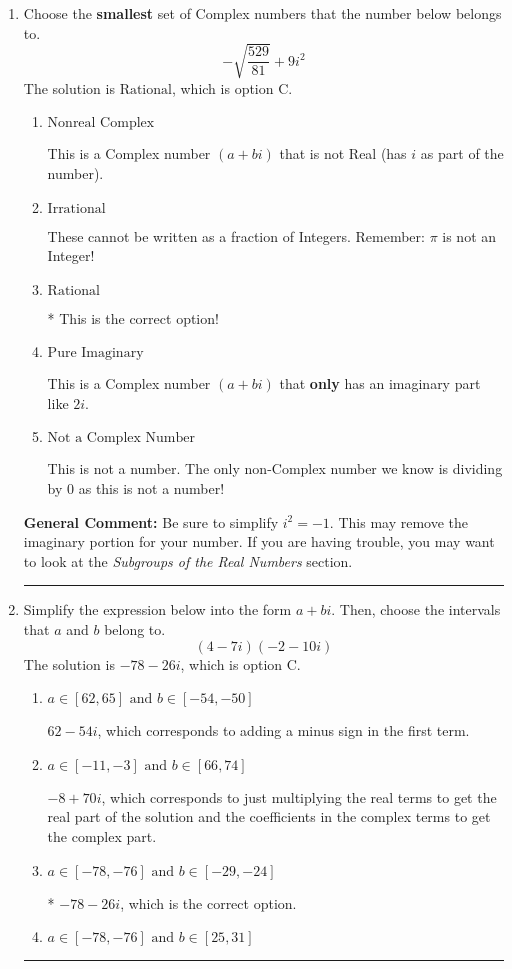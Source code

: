 \documentclass{extbook}[14pt]
\newcommand{\litem}[1]{\item #1

\rule{\textwidth}{0.4pt}}
\begin{document}
\begin{enumerate}\litem{
Choose the \textbf{smallest} set of Complex numbers that the number below belongs to.
\[ -\sqrt{\frac{529}{81}} + 9i^2 \]The solution is \( \text{Rational} \), which is option C.\begin{enumerate}[label=\Alph*.]
\item \( \text{Nonreal Complex} \)

This is a Complex number $(a+bi)$ that is not Real (has $i$ as part of the number).
\item \( \text{Irrational} \)

These cannot be written as a fraction of Integers. Remember: $\pi$ is not an Integer!
\item \( \text{Rational} \)

* This is the correct option!
\item \( \text{Pure Imaginary} \)

This is a Complex number $(a+bi)$ that \textbf{only} has an imaginary part like $2i$.
\item \( \text{Not a Complex Number} \)

This is not a number. The only non-Complex number we know is dividing by 0 as this is not a number!
\end{enumerate}

\textbf{General Comment:} Be sure to simplify $i^2 = -1$. This may remove the imaginary portion for your number. If you are having trouble, you may want to look at the \textit{Subgroups of the Real Numbers} section.
}
\litem{
Simplify the expression below into the form $a+bi$. Then, choose the intervals that $a$ and $b$ belong to.
\[ (4 - 7 i)(-2 - 10 i) \]The solution is \( -78 - 26 i \), which is option C.\begin{enumerate}[label=\Alph*.]
\item \( a \in [62, 65] \text{ and } b \in [-54, -50] \)

 $62 - 54 i$, which corresponds to adding a minus sign in the first term.
\item \( a \in [-11, -3] \text{ and } b \in [66, 74] \)

 $-8 + 70 i$, which corresponds to just multiplying the real terms to get the real part of the solution and the coefficients in the complex terms to get the complex part.
\item \( a \in [-78, -76] \text{ and } b \in [-29, -24] \)

* $-78 - 26 i$, which is the correct option.
\item \( a \in [-78, -76] \text{ and } b \in [25, 31] \)


\end{enumerate}}
\end{enumerate}
\end{document}
